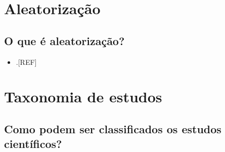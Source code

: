 \documentclass[
  a4paper,
]{book}
\providecommand{\tightlist}{%
  \setlength{\itemsep}{0pt}\setlength{\parskip}{0pt}}
\begin{document}
\hypertarget{aleatorizauxe7uxe3o}{%
\section{Aleatorização}\label{aleatorizauxe7uxe3o}}

\hypertarget{o-que-uxe9-aleatorizauxe7uxe3o}{%
\subsection{O que é aleatorização?}\label{o-que-uxe9-aleatorizauxe7uxe3o}}

\begin{itemize}
\tightlist
\item
  .{[}REF{]}
\end{itemize}

\hypertarget{taxonomia-estudos}{%
\section{Taxonomia de estudos}\label{taxonomia-estudos}}

\hypertarget{como-podem-ser-classificados-os-estudos-cientuxedficos}{%
\subsection{Como podem ser classificados os estudos científicos?}\label{como-podem-ser-classificados-os-estudos-cientuxedficos}}
\end{document}
